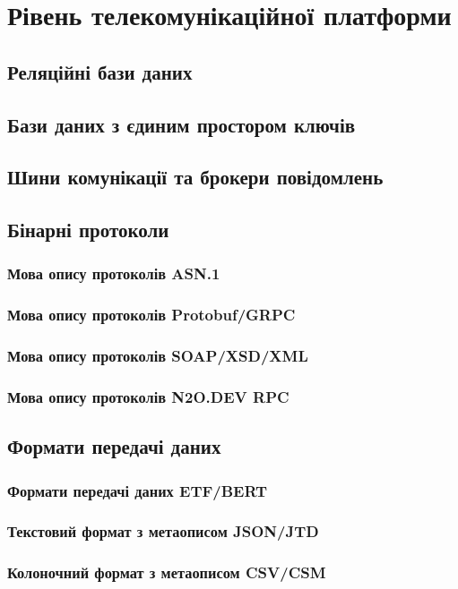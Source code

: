 
\chapter{Рівень телекомунікаційної платформи}

\section{Реляційні бази даних}

\section{Бази даних з єдиним простором ключів}

\section{Шини комунікації та брокери повідомлень}

\section{Бінарні протоколи}

\subsection{Мова опису протоколів ASN.1}

\subsection{Мова опису протоколів Protobuf/GRPC}

\subsection{Мова опису протоколів SOAP/XSD/XML}

\subsection{Мова опису протоколів N2O.DEV RPC}

\section{Формати передачі даних}

\subsection{Формати передачі даних ETF/BERT}

\subsection{Текстовий формат з метаописом JSON/JTD}

\subsection{Колоночний формат з метаописом CSV/CSM}

